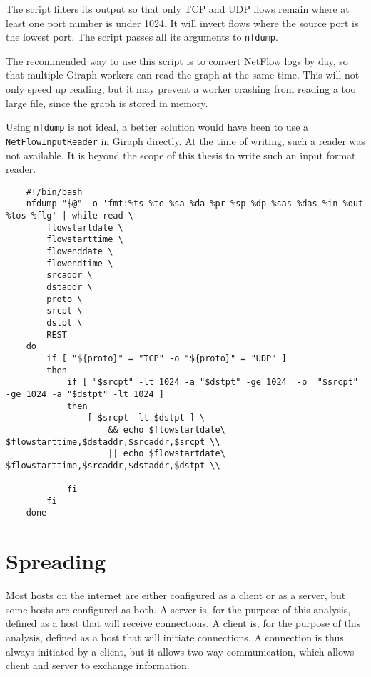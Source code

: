 The script filters its output so that only TCP and UDP flows remain where at least one port number is under 1024.
It will invert flows where the source port is the lowest port.
The script passes all its arguments to \verb"nfdump".

The recommended way to use this script is to convert NetFlow logs by day,
 so that multiple Giraph workers can read the graph at the same time.
This will not only speed up reading, but it may prevent a worker crashing from reading a too large file, since the graph is stored in memory.

Using \verb"nfdump" is not ideal, a better solution would have been to use a \verb"NetFlowInputReader" in Giraph directly.
At the time of writing, such a reader was not available.
It is beyond the scope of this thesis to write such an input format reader.

\begin{landscape}
\begin{verbatim}
	#!/bin/bash
	nfdump "$@" -o 'fmt:%ts %te %sa %da %pr %sp %dp %sas %das %in %out %tos %flg' | while read \
	    flowstartdate \
	    flowstarttime \
	    flowenddate \
	    flowendtime \
	    srcaddr \
	    dstaddr \
	    proto \
	    srcpt \
	    dstpt \
	    REST
	do
	    if [ "${proto}" = "TCP" -o "${proto}" = "UDP" ]
	    then
	        if [ "$srcpt" -lt 1024 -a "$dstpt" -ge 1024  -o  "$srcpt" -ge 1024 -a "$dstpt" -lt 1024 ]
	        then
	            [ $srcpt -lt $dstpt ] \
	                && echo $flowstartdate\ $flowstarttime,$dstaddr,$srcaddr,$srcpt \\
	                || echo $flowstartdate\ $flowstarttime,$srcaddr,$dstaddr,$dstpt \\

	        fi
	    fi
	done
\end{verbatim}
\end{landscape}


\section{Spreading}
Most hosts on the internet are either configured as a client or as a server, but some hosts are configured as both.
A server is, for the purpose of this analysis, defined as a host that will receive connections.
A client is, for the purpose of this analysis, defined as a host that will initiate connections.
A connection is thus always initiated by a client, but it allows two-way communication, which allows client and server to exchange information.

